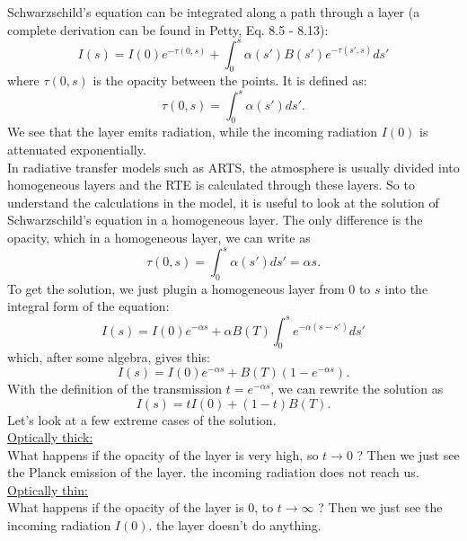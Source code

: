 Schwarzschild's equation can be integrated along a path through a layer
(a complete derivation can be found in Petty, Eq. 8.5 - 8.13):
\begin{equation}
	I(s) = I(0) e^{-\tau (0,s)} + \int_{0}^{s} \alpha (s') B(s') 
	e^{-\tau (s',s)} ds' 
\end{equation}
where $\tau(0,s)$ is the opacity between the points. It is defined as:
\begin{equation}
	\tau (0,s) = \int_{0}^{s} \alpha(s') ds'.
\end{equation}
We see that the layer emits radiation, while the incoming radiation $I(0)$ is 
attenuated exponentially. \\
In radiative transfer models such as ARTS, the atmosphere is usually divided 
into homogeneous layers and the RTE is calculated through these layers. So to understand
the calculations in the model, it is useful to look at the solution of Schwarzschild's
equation in a homogeneous layer. The only difference is the opacity, which in a homogeneous
layer, we can write as
\begin{equation}
	\tau(0,s) = \int_{0}^{s} \alpha(s') ds' = \alpha s.
\end{equation}
To get the solution, we just plugin a homogeneous layer from 0 to $s$ into the integral 
form of the equation:
\begin{equation}
	I(s) = I(0) e^{-\alpha s} + \alpha B(T)\int_{0}^{s} e^{-\alpha (s-s')} ds' 
\end{equation}
which, after some algebra, gives this:
\begin{equation}
	I(s) = I(0) e^{-\alpha s} + B(T) \left( 1-e^{-\alpha s} \right).
\end{equation}
With the definition of the transmission $t = e^{-\alpha s}$, we can rewrite the solution as
\begin{equation}
	I(s) = t I(0)  + \left( 1-t \right) B(T).
\end{equation}
Let's look at a few extreme cases of the solution.\\
\underline{Optically thick:}\\
What happens if the opacity of the layer is very high, so $ t\rightarrow0$ ? 
Then we just see the Planck emission of the layer. the incoming radiation does not reach us.\\
\underline{Optically thin:}\\
What happens if the opacity of the layer is 0, to $ t \rightarrow \infty$ ? Then we just see
the incoming radiation $I(0)$. the layer doesn't do anything.\\
